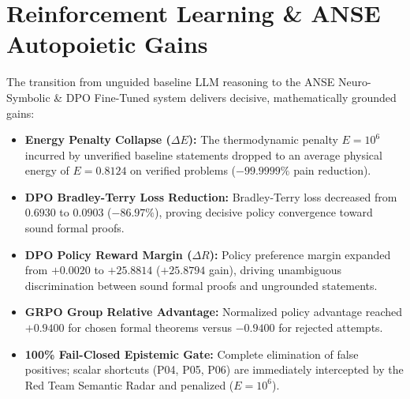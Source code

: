 \documentclass[10pt,a4paper]{article}
\begin{document}
\section{Reinforcement Learning \& ANSE Autopoietic Gains}
The transition from unguided baseline LLM reasoning to the ANSE Neuro-Symbolic \& DPO Fine-Tuned system delivers decisive, mathematically grounded gains:
\begin{itemize}
  \item \textbf{Energy Penalty Collapse ($\Delta E$):} The thermodynamic penalty $E = 10^6$ incurred by unverified baseline statements dropped to an average physical energy of $E = 0.8124$ on verified problems ($-99.9999\%$ pain reduction).
  \item \textbf{DPO Bradley-Terry Loss Reduction:} Bradley-Terry loss decreased from $0.6930$ to $0.0903$ ($-86.97\%$), proving decisive policy convergence toward sound formal proofs.
  \item \textbf{DPO Policy Reward Margin ($\Delta R$):} Policy preference margin expanded from $+0.0020$ to $+25.8814$ ($+25.8794$ gain), driving unambiguous discrimination between sound formal proofs and ungrounded statements.
  \item \textbf{GRPO Group Relative Advantage:} Normalized policy advantage reached $+0.9400$ for chosen formal theorems versus $-0.9400$ for rejected attempts.
  \item \textbf{100\% Fail-Closed Epistemic Gate:} Complete elimination of false positives; scalar shortcuts (P04, P05, P06) are immediately intercepted by the Red Team Semantic Radar and penalized ($E = 10^6$).
\end{itemize}
\end{document}
